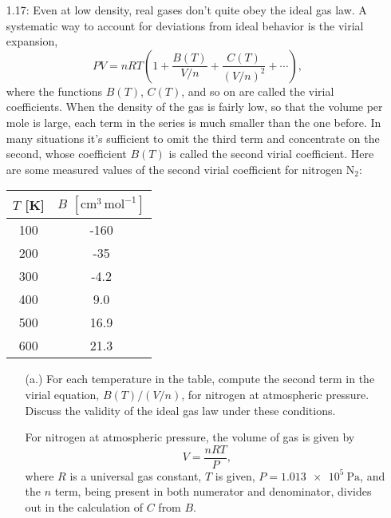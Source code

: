 \documentclass[a4paper, 12pt]{config/homework}
\begin{document}
\begin{enumerate}
\pagebreak
\item [1.17:] Even at low density, real gases don't quite obey the ideal gas law. A systematic way to account for deviations from ideal behavior is the virial expansion,
\[PV=nRT\left(1 + \frac{B(T)}{V/n} + \frac{C(T)}{(V/n)^2} + \cdots\right),\]
where the functions \(B(T)\), \(C(T)\), and so on are called the virial coefficients. When the density of the gas is fairly low, so that the volume per mole is large, each term in the series is much smaller than the one before. In many situations it's sufficient to omit the third term and concentrate on the second, whose coefficient \(B(T)\) is called the second virial coefficient. Here are some measured values of the second virial coefficient for nitrogen \(\text{N}_2\):
\begin{table}[H]
\begin{center}
\begin{tabular}{cc}
\(T\) {[}K{]} & \(B\) \(\left[\text{cm}^3\,\text{mol}^{-1}\right]\) \\ \hline
100           & -160                                   \\
200           & -35                                    \\
300           & -4.2                                   \\
400           & 9.0                                    \\
500           & 16.9                                   \\
600           & 21.3
\end{tabular}
\end{center}
\end{table}
\begin{enumerate}
\item[(a.)] For each temperature in the table, compute the second term in the virial equation, \(B(T)/(V/n)\), for nitrogen at atmospheric pressure. Discuss the validity of the ideal gas law under these conditions.

For nitrogen at atmospheric pressure, the volume of gas is given by
\[V = \frac{nRT}{P},\]
where \(R\) is a universal gas constant, \(T\) is given, \(P=\qty{1.013e5}{\pascal}\), and the \(n\) term, being present in both numerator and denominator, divides out in the calculation of \(C\) from \(B\).


\end{enumerate}
\end{enumerate}
\end{document}
